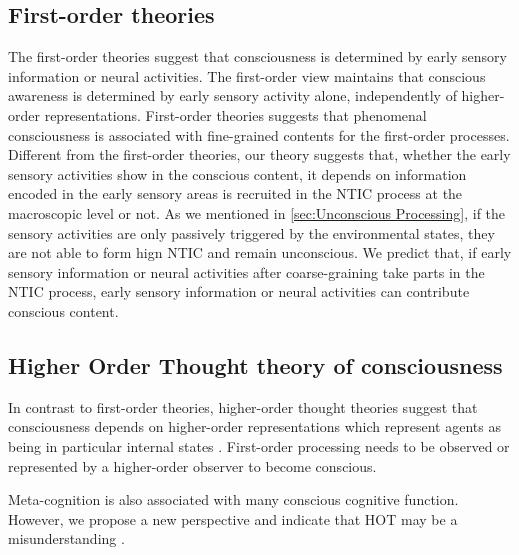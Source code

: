 \documentclass[utf8]{article}
\begin{document}
		\subsection{First-order theories}
            The first-order theories suggest that consciousness is determined by early sensory information or neural activities. The first-order view maintains that conscious awareness is determined by early sensory activity alone, independently of higher-order representations.
            First-order theories suggests that phenomenal consciousness is associated with fine-grained contents for the first-order processes. Different from the first-order theories, our theory suggests that, whether the early sensory activities show in the conscious content, it depends on information encoded in the early sensory areas is recruited in the NTIC process at the macroscopic level or not. As we mentioned in \ref{sec:Unconscious Processing}, if the sensory activities are only passively triggered by the environmental states, they are not able to form hign NTIC and remain unconscious. We predict that, if early sensory information or neural activities after coarse-graining take parts in the NTIC process, early sensory information or neural activities can contribute conscious content. 
		
		
		\subsection{Higher Order Thought theory of consciousness}
		    In contrast to first-order theories, higher-order thought theories suggest that consciousness depends on higher-order representations which represent agents as being in particular internal states \citep{lau2011empirical}. First-order processing needs to be observed or represented by a higher-order observer to become conscious. 
		    
		    
		    Meta-cognition is also associated with many conscious cognitive function. However, we propose a new perspective and indicate that HOT may be a misunderstanding . 
		    
\end{document}
